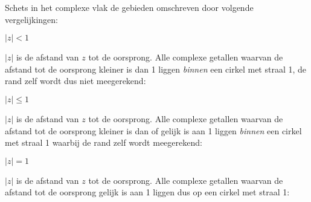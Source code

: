 \documentclass{ximera}
\begin{document}
\begin{exercise}
	Schets in het complexe vlak de gebieden omschreven door volgende vergelijkingen:

\begin{question} 
$|z| < 1$
\begin{oplossing} $|z|$ is de afstand van $z$ tot de oorsprong. Alle complexe getallen waarvan de afstand tot de oorsprong kleiner is dan 1 liggen \textit{binnen} een cirkel met straal 1, de rand zelf wordt dus niet meegerekend:
           
\begin{image}[0.4\textwidth]
\end{image}           
\end{oplossing}
\end{question}

\begin{question} 
$|z| \leq 1$
\begin{oplossing} $|z|$ is de afstand van $z$ tot de oorsprong. Alle complexe getallen waarvan de afstand tot de oorsprong kleiner is dan of gelijk is aan 1 liggen \textit{binnen} een cirkel met straal 1 waarbij de rand zelf wordt meegerekend:
           
\begin{image}[0.4\textwidth]
\end{image}           
\end{oplossing}
\end{question}

\begin{question} 
$|z| = 1$
\begin{oplossing} $|z|$ is de afstand van $z$ tot de oorsprong. Alle complexe getallen waarvan de afstand tot de oorsprong gelijk is aan 1 liggen dus op een cirkel met straal 1:
           

\end{oplossing}
\end{question}
\end{exercise}
\end{document}
